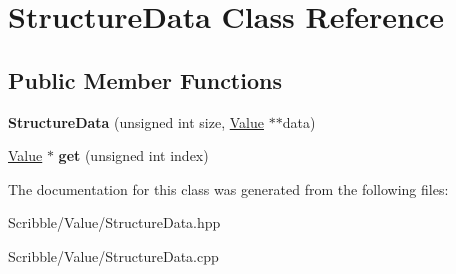 \hypertarget{class_structure_data}{\section{Structure\-Data Class Reference}
\label{class_structure_data}
}
\subsection*{Public Member Functions}
\begin{DoxyCompactItemize}
\item 
\hypertarget{class_structure_data_a20d59378b3995244d8db8f1cf9f260ac}{{\bfseries Structure\-Data} (unsigned int size, \hyperlink{class_value}{Value} $\ast$$\ast$data)}\label{class_structure_data_a20d59378b3995244d8db8f1cf9f260ac}

\item 
\hypertarget{class_structure_data_a7f6a97b6fad22c52a3692bb248cdec39}{\hyperlink{class_value}{Value} $\ast$ {\bfseries get} (unsigned int index)}\label{class_structure_data_a7f6a97b6fad22c52a3692bb248cdec39}

\end{DoxyCompactItemize}


The documentation for this class was generated from the following files\-:\begin{DoxyCompactItemize}
\item 
Scribble/\-Value/Structure\-Data.\-hpp\item 
Scribble/\-Value/Structure\-Data.\-cpp\end{DoxyCompactItemize}
